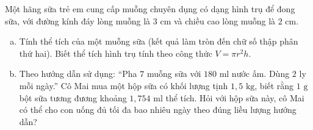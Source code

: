 \begin{bt}%
Một hãng sữa trẻ em cung cấp muỗng chuyên dụng có dạng hình trụ để đong sữa, với đường kính đáy lòng muỗng là $3\text{ cm}$ và chiều cao lòng muỗng là $2\text{ cm}$.
\begin{enumerate}[a)]
    \item Tính thể tích của một muỗng sữa (kết quả làm tròn đến chữ số thập phân thứ hai). Biết thể tích hình trụ tính theo công thức $V = \pi r^2 h$.
    \item Theo hướng dẫn sử dụng: ``Pha $7$ muỗng sữa với $180\text{ ml}$ nước ấm. Dùng $2$ ly mỗi ngày.'' Cô Mai mua một hộp sữa có khối lượng tịnh $1{,}5\text{ kg}$, biết rằng $1\text{ g}$ bột sữa tương đương khoảng $1{,}754\text{ ml}$ thể tích. Hỏi với hộp sữa này, cô Mai có thể cho con uống đủ tối đa bao nhiêu ngày theo đúng liều lượng hướng dẫn?
\end{enumerate}
\end{bt}

